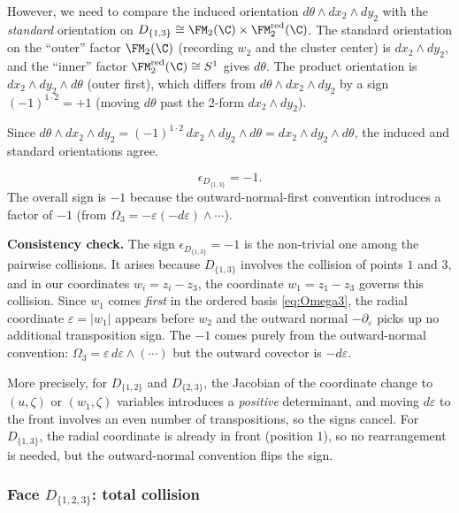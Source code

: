 However, we need to compare the induced orientation $d\theta\wedge dx_2\wedge dy_2$ with the \emph{standard} orientation on $D_{\{1,3\}} \cong \FM_2(\C)\times \FM_2^{\mathrm{red}}(\C)$. The standard orientation on the ``outer'' factor $\FM_2(\C)$ (recording $w_2$ and the cluster center) is $dx_2\wedge dy_2$, and the ``inner'' factor $\FM_2^{\mathrm{red}}(\C) \cong S^1$ gives $d\theta$. The product orientation is $dx_2\wedge dy_2\wedge d\theta$ (outer first), which differs from $d\theta\wedge dx_2\wedge dy_2$ by a sign $(-1)^{1\cdot 2} = +1$ (moving $d\theta$ past the 2-form $dx_2\wedge dy_2$).

Since $d\theta\wedge dx_2\wedge dy_2 = (-1)^{1\cdot 2}\,dx_2\wedge dy_2\wedge d\theta = dx_2\wedge dy_2\wedge d\theta$, the induced and standard orientations agree.

\begin{equation}
\label{eq:eps-D13}
\boxed{\epsilon_{D_{\{1,3\}}} = -1.}
\end{equation}
The overall sign is $-1$ because the outward-normal-first convention introduces a factor of $-1$ (from $\Omega_3 = -\varepsilon(-d\varepsilon)\wedge\cdots$).

\noindent\textbf{Consistency check.} The sign $\epsilon_{D_{\{1,3\}}} = -1$ is the non-trivial one among the pairwise collisions. It arises because $D_{\{1,3\}}$ involves the collision of points $1$ and $3$, and in our coordinates $w_i = z_i - z_3$, the coordinate $w_1 = z_1 - z_3$ governs this collision. Since $w_1$ comes \emph{first} in the ordered basis \eqref{eq:Omega3}, the radial coordinate $\varepsilon = |w_1|$ appears before $w_2$ and the outward normal $-\partial_\varepsilon$ picks up no additional transposition sign. The $-1$ comes purely from the outward-normal convention: $\Omega_3 = \varepsilon\,d\varepsilon\wedge(\cdots)$ but the outward covector is $-d\varepsilon$.

More precisely, for $D_{\{1,2\}}$ and $D_{\{2,3\}}$, the Jacobian of the coordinate change to $(u,\zeta)$ or $(w_1,\zeta)$ variables introduces a \emph{positive} determinant, and moving $d\varepsilon$ to the front involves an even number of transpositions, so the signs cancel. For $D_{\{1,3\}}$, the radial coordinate is already in front (position 1), so no rearrangement is needed, but the outward-normal convention flips the sign.

\subsubsection{Face $D_{\{1,2,3\}}$: total collision}

